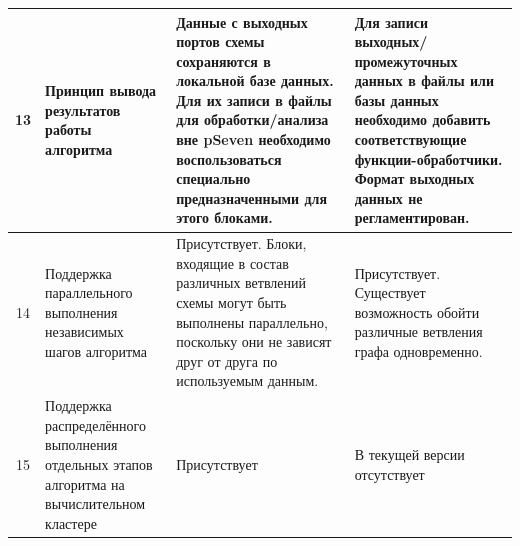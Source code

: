 \begin{landscape}
\begin{longtable}{|c|p{}|p{}|p{}|}
    \hline
    13         & Принцип вывода результатов работы алгоритма                                                & Данные с выходных портов схемы сохраняются в локальной базе данных. Для их записи в файлы для обработки/анализа вне pSeven необходимо воспользоваться специально предназначенными для этого блоками.                                                                                                                                                                                                                                                                                                                                                                                                                                            & Для записи выходных/промежуточных данных в файлы или базы данных необходимо добавить соответствующие функции-обработчики. Формат выходных данных не регламентирован.                                                                                                              \\
    \hline
    14         & Поддержка параллельного выполнения независимых шагов алгоритма                             & Присутствует. Блоки, входящие в состав различных ветвлений схемы могут быть выполнены параллельно, поскольку они не зависят друг от друга по используемым данным.                                                                                                                                                                                                                                                                                                                                                                                                                                                                               & Присутствует. Существует возможность обойти различные ветвления графа одновременно.                                                                                                                                                                                               \\
    \hline
    15         & Поддержка распределённого выполнения отдельных этапов алгоритма на вычислительном кластере & Присутствует                                                                                                                                                                                                                                                                                                                                                                                                                                                                                                                                                                                                                                    & В текущей версии отсутствует                                                                                                                                                                                                                                                      \\

\end{longtable}
\end{landscape}
